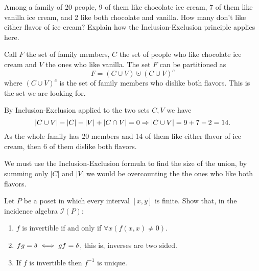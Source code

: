 \documentclass[12pt]{memoir}
\begin{document}
\begin{Ej}[Exercise 1]
    Among a family of 20 people, 9 of them like chocolate ice cream, 7 of them like vanilla ice cream, and 2 like both chocolate and vanilla. How many don't like either flavor of ice cream? Explain how the Inclusion-Exclusion principle applies here.
 \end{Ej}

\begin{ptcbr}
   Call $F$ the set of family members, $C$ the set of people who like chocolate ice cream and $V$ the ones who like vanilla. The set $F$ can be partitioned as 
   $$F=(C\cup V)\cupdot (C\cup V)^c$$
   where $(C\cup V)^c$ is the set of family members who dislike both flavors. This is the set we are looking for.\par 
   By Inclusion-Exclusion applied to the two sets $C,V$ we have 
   $$|C\cup V|-|C|-|V|+|C\cap V|=0\Rightarrow |C\cup V|=9+7-2=14.$$
   As the whole family has 20 members and 14 of them like either flavor of ice cream, then 6 of them dislike both flavors.\par 
   We must use the Inclusion-Exclusion formula to find the size of the union, by summing only $|C|$ and $|V|$ we would be overcounting the the ones who like both flavors.
\end{ptcbr}

\begin{Ej}
    Let $P$ be a poset in which every interval $[x, y]$ is finite. Show that, in the incidence algebra $\mathscr{I}(P)$:
    \vspace*{-0.4em}
    \begin{enumerate}
        \itemsep=-0.4em
        \item $f$ is invertible if and only if $\forall x(f(x,x)\neq 0)$.
        \item $fg=\delta\iff gf=\delta$, this is, inverses are two sided.
        \item If $f$ is invertible then $f^{-1}$ is unique.
    \end{enumerate}
\end{Ej}
\end{document}
